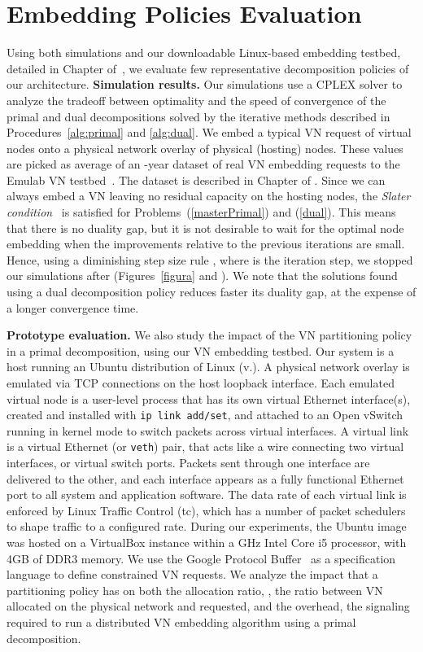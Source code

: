 \documentclass[a4paper, 10pt, conference]{ieeeconf}
\begin{document}
\section{Embedding Policies Evaluation}\label{sec:eval}
\vspace{-1mm}
Using both simulations and our downloadable Linux-based embedding testbed, detailed in Chapter  of~\cite{myPhDThesisTR}, we evaluate few representative decomposition policies of our architecture.
{\bf Simulation results.} Our simulations use a CPLEX solver to analyze the tradeoff between optimality and the speed of convergence of the primal and dual decompositions solved by the iterative methods described in Procedures~\ref{alg:primal} and \ref{alg:dual}.  We embed a typical VN request of  virtual nodes onto a physical network overlay of  physical (hosting) nodes. These values are picked as average of an -year dataset of real VN embedding requests to the Emulab VN testbed~\cite{emulab}. The dataset is described in Chapter  of \cite{myPhDThesisTR}.
Since we can always embed a VN leaving no residual capacity on the hosting nodes, the {\it Slater condition}~\cite{boyd-book} is satisfied for Problems~(\ref{masterPrimal}) and (\ref{dual}). This means that there is no duality gap, but it is not desirable to wait for the optimal node embedding when the improvements relative to the previous iterations are small. Hence, using a diminishing step size rule , where  is the iteration step, we stopped our simulations after  (Figures~\ref{figura} and ). We note that the solutions found using a dual decomposition policy reduces faster its duality gap, at the expense of a longer convergence time.  

\noindent
{\bf Prototype evaluation.} We also study the impact of the VN partitioning policy in a primal decomposition, using our VN embedding testbed. Our system is a host running an Ubuntu distribution of Linux (v.).  A physical network overlay is emulated via TCP connections on the host loopback interface. 
Each emulated virtual node is a user-level process that has its own virtual Ethernet interface(s), created and installed with {\tt ip link add/set}, and attached to an Open vSwitch~\cite{openvswitch} running in kernel mode to switch packets across virtual interfaces. 
A virtual link is a virtual Ethernet (or {\tt veth}) pair, that acts like a wire connecting two virtual interfaces, or virtual switch ports. Packets sent through one interface are delivered to the other, and each interface appears as a fully functional Ethernet port to all system and application software. The data rate of each virtual link is enforced by Linux Traffic Control (tc), which has a number of packet schedulers to shape traffic to a configured rate. 
During our experiments, the Ubuntu image was hosted on a VirtualBox instance within a  GHz Intel Core i5 processor, with 4GB of DDR3 memory. We use the Google Protocol Buffer~\cite{GoogleProtocolBuffer} as a specification language to define constrained VN requests. We analyze the impact that a partitioning policy has on both the allocation ratio, , the ratio between VN allocated on the physical network and requested, and the overhead,  the signaling required to run a distributed VN embedding algorithm using a primal decomposition. 
\end{document}
